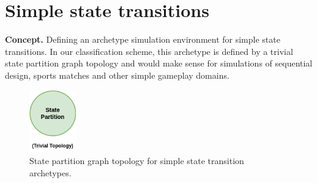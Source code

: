 \chapter{\sffamily Simple state transitions}

{\bfseries\sffamily Concept.} Defining an archetype simulation environment for simple state transitions. In our classification scheme, this archetype is defined by a trivial state partition graph topology and would make sense for simulations of sequential design, sports matches and other simple gameplay domains.


\begin{figure}[h]
\centering
\includegraphics[width=2cm]{images/chapter-6-state-partition-graph.drawio.png}
\caption{State partition graph topology for simple state transition archetypes.}
\label{fig:state-partition-graph-simple-state-transitions}
\end{figure}
